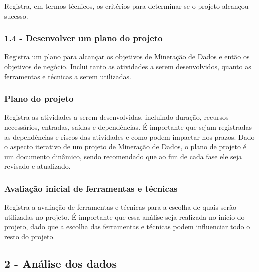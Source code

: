 Registra, em termos técnicos, os critérios para determinar se o projeto alcançou sucesso.

\subsubsection*{\textbf{1.4 - Desenvolver um plano do projeto}}

Registra um plano para alcançar os objetivos de Mineração de Dados e então os objetivos de negócio. Inclui tanto as atividades a serem desenvolvidos, quanto as ferramentas e técnicas a serem utilizadas.

\subsubsection*{Plano do projeto}

Registra as atividades a serem desenvolvidas, incluindo duração, recursos necessários, entradas, saídas e dependências. É importante que sejam registradas as dependências e riscos das atividades e como podem impactar nos prazos.
Dado o aspecto iterativo de um projeto de Mineração de Dados, o plano de projeto é um documento dinâmico, sendo recomendado que ao fim de cada fase ele seja revisado e atualizado.

\subsubsection*{Avaliação inicial de ferramentas e técnicas}

Registra a avaliação de ferramentas e técnicas para a escolha de quais serão utilizadas no projeto. É importante que essa análise seja realizada no início do projeto, dado que a escolha das ferramentas e técnicas podem influenciar todo o resto do projeto.

\newpage 

\subsection*{2 - Análise dos dados}


